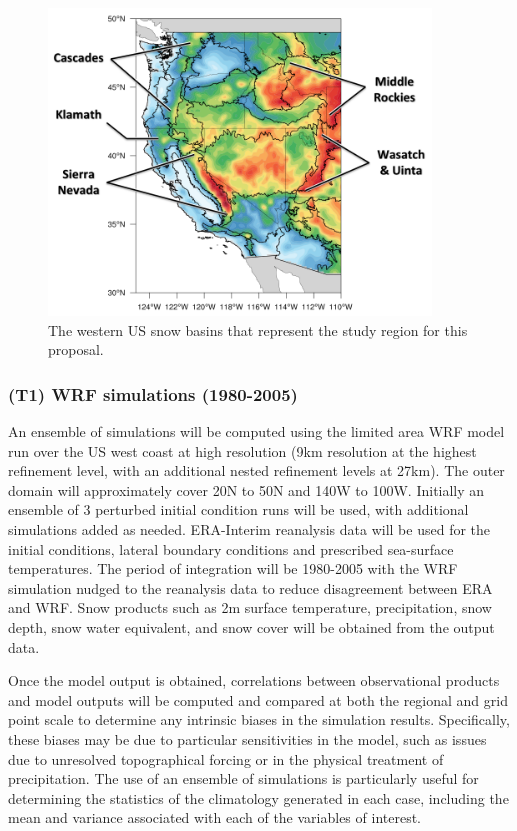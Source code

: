 \documentclass[11pt]{article}
\begin{document}
\begin{figure}
\begin{center}
\includegraphics[width=4in]{SnowBasins.png}
\end{center}
\caption{The western US snow basins that represent the study region for this proposal.} \label{fig:SnowBasins}
\end{figure}

\subsubsection{(T1) WRF simulations (1980-2005)}

An ensemble of simulations will be computed using the limited area WRF model run over the US west coast at high resolution (9km resolution at the highest refinement level, with an additional nested refinement levels at 27km). The outer domain will approximately cover 20N to 50N and 140W to 100W. Initially an ensemble of 3 perturbed initial condition runs will be used, with additional simulations added as needed. ERA-Interim reanalysis data will be used for the initial conditions, lateral boundary conditions and prescribed sea-surface temperatures. The period of integration will be 1980-2005 with the WRF simulation nudged to the reanalysis data to reduce disagreement between ERA and WRF. Snow products such as 2m surface temperature, precipitation, snow depth, snow water equivalent, and snow cover will be obtained from the output data.

Once the model output is obtained, correlations between observational products and model outputs will be computed and compared at both the regional and grid point scale to determine any intrinsic biases in the simulation results. Specifically, these biases may be due to particular sensitivities in the model, such as issues due to unresolved topographical forcing or in the physical treatment of precipitation. The use of an ensemble of simulations is particularly useful for determining the statistics of the climatology generated in each case, including the mean and variance associated with each of the variables of interest.
\end{document}
